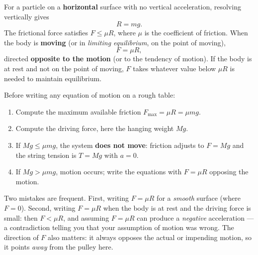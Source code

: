\documentclass[11pt]{article}
\begin{document}
\begin{propriete}
For a particle on a \textbf{horizontal} surface with no vertical acceleration, resolving vertically gives
\[ R = mg. \]
The frictional force satisfies $F \le \mu R$, where $\mu$ is the coefficient of friction. When the body is \textbf{moving} (or in \emph{limiting equilibrium}, on the point of moving),
\[ F = \mu R, \]
directed \textbf{opposite to the motion} (or to the tendency of motion). If the body is at rest and not on the point of moving, $F$ takes whatever value below $\mu R$ is needed to maintain equilibrium.
\end{propriete}

\begin{methode}
Before writing any equation of motion on a rough table:
\begin{enumerate}
\item Compute the maximum available friction $F_{\max} = \mu R = \mu mg$.
\item Compute the driving force, here the hanging weight $Mg$.
\item If $Mg \le \mu mg$, the system \textbf{does not move}: friction adjusts to $F = Mg$ and the string tension is $T = Mg$ with $a = 0$.
\item If $Mg > \mu mg$, motion occurs; write the equations with $F = \mu R$ opposing the motion.
\end{enumerate}
\end{methode}

\begin{attention}[Do not write $F = \mu R$ blindly]
Two mistakes are frequent. First, writing $F = \mu R$ for a \emph{smooth} surface (where $F = 0$). Second, writing $F = \mu R$ when the body is at rest and the driving force is small: then $F < \mu R$, and assuming $F = \mu R$ can produce a \emph{negative} acceleration — a contradiction telling you that your assumption of motion was wrong. The direction of $F$ also matters: it always opposes the actual or impending motion, so it points \emph{away} from the pulley here.
\end{attention}
\end{document}
